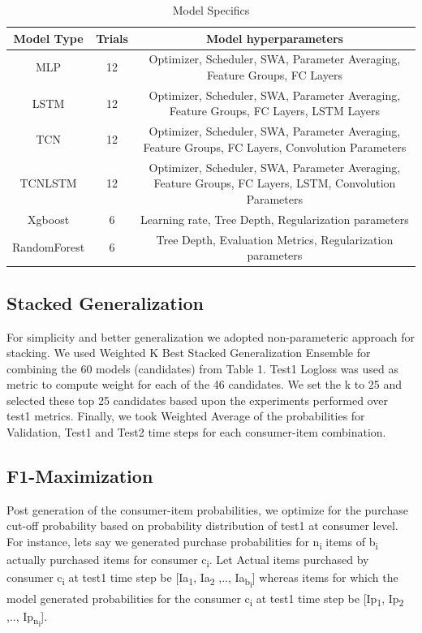 \begin{table}[t]
\caption{ Model Specifics}
\vspace{0.1 in}
\centering
\resizebox{3.3in}{!}
{%
\begin{tabular}{c|c|c}
\hline
{\bf Model Type} & {\bf Trials} & {\bf Model hyperparameters} \\  \hline
MLP	  		&  12 & Optimizer, Scheduler, SWA, Parameter Averaging, Feature Groups, FC Layers \\ \hline
LSTM  		& 12 & Optimizer, Scheduler, SWA, Parameter Averaging, Feature Groups, FC Layers, LSTM Layers  \\ \hline
TCN			& 12	& Optimizer, Scheduler, SWA, Parameter Averaging, Feature Groups, FC Layers, Convolution Parameters  \\ \hline
TCNLSTM 		& 12	& Optimizer, Scheduler, SWA, Parameter Averaging, Feature Groups, FC Layers, LSTM, Convolution Parameters  \\ \hline
Xgboost 		& 6	& Learning rate, Tree Depth, Regularization parameters  \\ \hline
RandomForest 		& 6	& Tree Depth, Evaluation Metrics, Regularization parameters \\ \hline
\end{tabular}
}
\label{tab:models}
\end{table}

\subsection{Stacked Generalization}
For simplicity and better generalization we adopted non-parameteric approach for stacking.
We used Weighted K Best Stacked Generalization Ensemble for combining the 60 models (candidates) from Table 1. 
Test1 Logloss was used as metric to compute weight for each of the 46 candidates. We set the k to 25 and selected 
these top 25 candidates based upon the experiments performed over test1 metrics. Finally, we took Weighted Average of 
the probabilities for Validation, Test1 and Test2 time steps for each consumer-item combination.

\subsection{F1-Maximization}
Post generation of the consumer-item probabilities, we optimize for the purchase cut-off probability based on 
probability distribution of test1 at consumer level. For instance, lets say we generated purchase probabilities for 
n\textsubscript{i} items of b\textsubscript{i} actually purchased items for consumer c\textsubscript{i}.
Let Actual items purchased by consumer c\textsubscript{i} at test1 time step be [Ia\textsubscript{1}, Ia\textsubscript{2}
,.., Ia\textsubscript{b\textsubscript{i}}] whereas items for which the model generated probabilities for the 
consumer c\textsubscript{i} at test1 time step be [Ip\textsubscript{1}, Ip\textsubscript{2} ,.., 
Ip\textsubscript{n\textsubscript{i}}]. 

